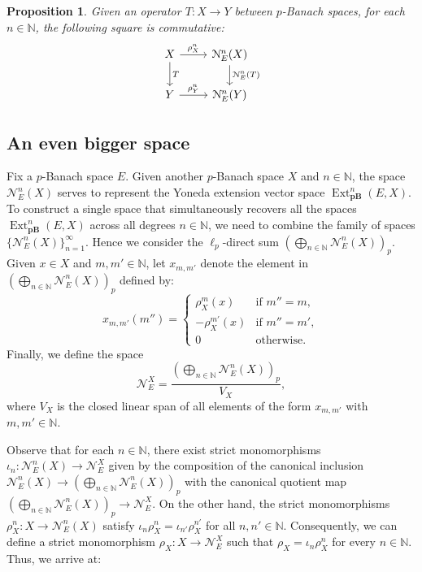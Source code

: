\documentclass[12pt,a4paper]{amsproc}
\newtheorem{prop}[thm]{Proposition}
\theoremstyle{remark}
\theoremstyle{definition}
\newcommand{\Ext}{\operatorname{Ext}}
\newcommand{\pBan}{\operatorname{\textbf{pB}}}
\numberwithin{equation}{section}
\begin{document}
	\begin{prop}\label{commu}
		Given an operator $T:X \to Y$ between $p$-Banach spaces, for each $n \in \mathbb{N}$, the following square is commutative:
		\begin{equation}
			\label{square1}
			\begin{tikzcd}
				X \arrow[r, "\rho_X^n"] \arrow[d, "T"] & \mathcal{N}^n_E(X) \arrow[d, "\mathcal{N}^n_E(T)"] \\
				Y \arrow[r, "\rho^n_Y"]                & \mathcal{N}^n_E(Y)                                   
			\end{tikzcd}
		\end{equation}
	\end{prop}

\subsection{An even bigger space}
Fix a $p$-Banach space $E$. Given another $p$-Banach space $X$ and $n \in \mathbb{N}$, the space $\mathcal{N}^n_E(X)$ serves to represent the Yoneda extension vector space $\Ext^n_{\boldsymbol{\pBan}}(E,X)$. To construct a single space that simultaneously recovers all the spaces $\Ext^n_{\boldsymbol{\pBan}}(E,X)$ across all degrees $n \in \mathbb{N}$, we need to combine the family of spaces $\{\mathcal{N}^n_E(X)\}_{n=1}^{\infty}$.
Hence we consider the $\ell_p$-direct sum $\left( \bigoplus_{n \in \mathbb{N}} \mathcal{N}^n_E(X) \right)_p$. Given $x \in X$ and $m, m' \in \mathbb{N}$, let $x_{m,m'}$ denote the element in $\left( \bigoplus_{n \in \mathbb{N}} \mathcal{N}^n_E(X) \right)_p$ defined by:
\[
	x_{m,m'}(m'') = \begin{cases}
		\rho_X^m(x) & \text{if } m'' = m, \\
		-\rho_X^{m'}(x) & \text{if } m'' = m', \\
		0 & \text{otherwise.}
	\end{cases}
\]
Finally, we define the space
\begin{equation}\label{bigspace}
	\mathcal{N}_E^X = \frac{\left( \bigoplus_{n \in \mathbb{N}} \mathcal{N}^n_E(X) \right)_p}{V_X},
\end{equation}
where $V_X$ is the closed linear span of all elements of the form $x_{m,m'}$ with $m, m' \in \mathbb{N}$.
\par Observe that for each $n \in \mathbb{N}$, there exist strict monomorphisms $\iota_n: \mathcal{N}_E^n(X) \to \mathcal{N}_E^X$ given by the composition of the canonical inclusion $\mathcal{N}_E^n(X) \to \left( \bigoplus_{n \in \mathbb{N}} \mathcal{N}^n_E(X) \right)_p$ with the canonical quotient map $\left( \bigoplus_{n \in \mathbb{N}} \mathcal{N}^n_E(X) \right)_p \to \mathcal{N}_E^X$. On the other hand, the strict monomorphisms $\rho_X^n: X \to \mathcal{N}_E^n(X)$ satisfy $\iota_n \rho_X^n = \iota_{n'} \rho_X^{n'}$ for all $n, n' \in \mathbb{N}$. Consequently, we can define a strict monomorphism $\rho_X: X \to \mathcal{N}_E^X$ such that $\rho_X = \iota_n \rho_X^n$ for every $n \in \mathbb{N}$. Thus, we arrive at:
\end{document}
